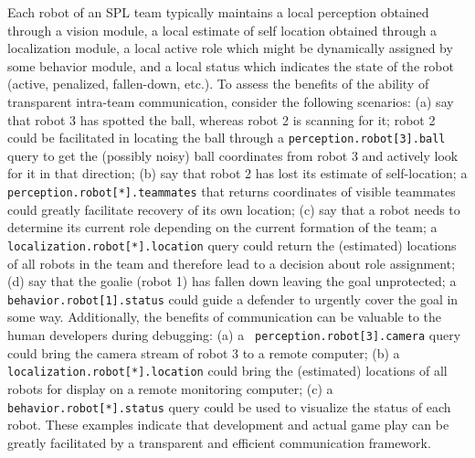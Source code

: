 Each robot of an SPL team typically maintains a local perception obtained through a vision module, a local estimate of self location obtained through a localization module, a local active role which might be dynamically assigned by some behavior module, and a local status which indicates the state of the robot (active, penalized, fallen-down, etc.). To assess the benefits of the ability of transparent intra-team communication, consider the following scenarios: (a) say that robot 3 has spotted the ball, whereas robot 2 is scanning for it; robot 2 could be facilitated in locating the ball through a {\tt perception.robot[3].ball} query to get the (possibly noisy) ball coordinates from robot 3 and actively look for it in that direction; (b) say that robot 2 has lost its estimate of self-location; a {\tt perception.robot[*].teammates} that returns coordinates of visible teammates could greatly facilitate recovery of its own location; (c) say that a robot needs to determine its current role depending on the current formation of the team; a {\tt localization.robot[*].location} query could return the (estimated) locations of all robots in the team and therefore lead to a decision about role assignment; (d) say that the goalie (robot 1) has fallen down leaving the goal unprotected; a {\tt behavior.robot[1].status} could guide a defender to urgently cover the goal in some way. Additionally, the benefits of communication can be valuable to the human developers during debugging: (a) a {\tt
perception.robot[3].camera} query could bring the camera stream of robot 3 to a remote computer; (b) a {\tt
localization.robot[*].location} could bring the (estimated) locations of all robots for display on a remote monitoring
computer; (c) a {\tt behavior.robot[*].status} query could be used to visualize the status of each robot. These examples
indicate that development and actual game play can be greatly facilitated by a transparent and efficient communication
framework. 

